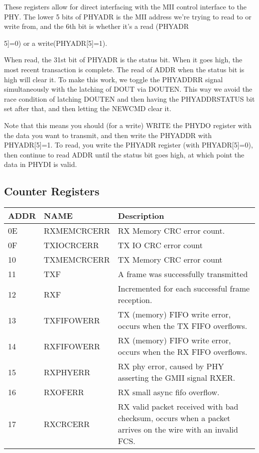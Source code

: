 These registers allow for direct interfacing with the MII control
interface to the PHY. The lower 5 bits of PHYADR is the MII address
we're trying to read to or write from, and the 6th bit is whether it's
a read (PHYADR{5]=0) or a write(PHYADR[5]=1).

  When read, the 31st bit of PHYADR is the status bit. When it goes
  high, the most recent transaction is complete. The read of ADDR when
  the status bit is high will clear it. To make this work, we toggle
  the PHYADDRR signal simultaneously with the latching of DOUT via
  DOUTEN.  This way we avoid the race condition of latching DOUTEN and
  then having the PHYADDRSTATUS bit set after that, and then letting
  the NEWCMD clear it.

  Note that this means you should (for a write) WRITE the PHYDO
  register with the data you want to transmit, and then write the
  PHYADDR with PHYADR[5]=1. To read, you write the PHYADR register
  (with PHYADR[5]=0), then continue to read ADDR until the status bit
  goes high, at which point the data in PHYDI is valid.

\subsection{Counter Registers}
\begin{tabular}{|l|l|p{5in}|}
  \hline
  ADDR & NAME & Description \\
  \hline
  0E & RXMEMCRCERR & RX Memory CRC error count. \\
  \hline
  0F & TXIOCRCERR  & TX IO CRC error count \\
  \hline
  10 & TXMEMCRCERR & TX Memory CRC error count  \\
  \hline
  11 & TXF         & A frame was successfully transmitted \\
  \hline
  12 & RXF         & Incremented for each successful frame reception. \\
  \hline
  13 & TXFIFOWERR  & TX (memory) FIFO write error, occurs when the TX FIFO overflows. \\
  \hline
  14 & RXFIFOWERR  & RX (memory) FIFO write error, occurs when the RX FIFO overflows. \\
  \hline
  15 & RXPHYERR    & RX phy error, caused by PHY asserting the GMII signal RXER.\\
  \hline
  16 & RXOFERR     & RX small async fifo overflow. \\
  \hline
  17 & RXCRCERR    & RX valid packet received with bad checksum, occurs when a packet arrives on the wire with an invalid FCS. \\
  \hline
\end{tabular}


}
